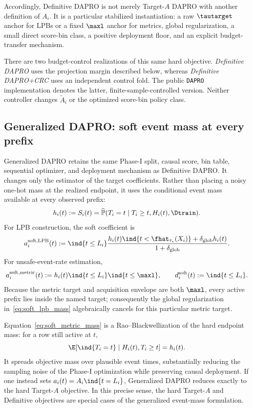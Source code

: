 Accordingly, Definitive DAPRO is not merely Target-$A$ DAPRO with another
definition of $A_i$.  It is a particular stabilized instantiation: a raw
$\tautarget$ anchor for LPBs or a fixed $\maxl$ anchor for metrics, global
regularization, a small direct score-bin class, a positive deployment floor,
and an explicit budget-transfer mechanism.

There are two budget-control realizations of this same hard objective.
\emph{Definitive DAPRO} uses the projection margin described below, whereas
\emph{Definitive DAPRO+CRC} uses an independent control fold.  The public
\texttt{DAPRO} implementation denotes the latter, finite-sample-controlled
version.  Neither controller changes $\widetilde A_i$ or the optimized
score-bin policy class.

\subsection{Generalized DAPRO: soft event mass at every prefix}

Generalized DAPRO retains the same Phase-I split, causal score, bin table,
sequential optimizer, and deployment mechanism as Definitive DAPRO.  It
changes only the estimator of the target coefficients.  Rather than placing a
noisy one-hot mass at the realized endpoint, it uses the conditional event
mass available at every observed prefix:
\begin{equation}
    h_i(t):=S_i(t)
    =\widehat{\mathbb P}(T_i=t\mid T_i\geq t,H_i(t),\Dtrain).
\end{equation}
For LPB construction, the soft coefficient is
\begin{equation}
    a_i^{\mathrm{soft,LPB}}(t)
    :=\ind{t\leq L_i}
    \frac{
      h_i(t)\ind{t<\fhat_{\tau_\star}(X_i)}
      +\delta_{\mathrm{glob}}h_i(t)
    }{1+\delta_{\mathrm{glob}}}.
    \label{eq:soft_lpb_mass}
\end{equation}
For unsafe-event-rate estimation,
\begin{equation}
    a_i^{\mathrm{soft,metric}}(t)
    :=h_i(t)\ind{t\leq L_i}\ind{t\leq\maxl},
    \qquad
    d_i^{\mathrm{soft}}(t):=\ind{t\leq L_i}.
    \label{eq:soft_metric_mass}
\end{equation}
Because the metric target and acquisition envelope are both $\maxl$, every
active prefix lies inside the named target; consequently the global
regularization in~\eqref{eq:soft_lpb_mass} algebraically cancels for this
particular metric target.

Equation~\eqref{eq:soft_metric_mass} is a Rao--Blackwellization of the hard
endpoint mass: for a row still active at $t$,
\begin{equation}
    \E[\ind{T_i=t}\mid H_i(t),T_i\geq t]=h_i(t).
\end{equation}
It spreads objective mass over plausible event times, substantially reducing
the sampling noise of the Phase-I optimization while preserving causal
deployment.  If one instead sets
$a_i(t)=A_i\ind{t=L_i}$, Generalized DAPRO reduces exactly to the hard
Target-$A$ objective.  In this precise sense, the hard Target-$A$ and
Definitive objectives are special cases of the generalized event-mass
formulation.


